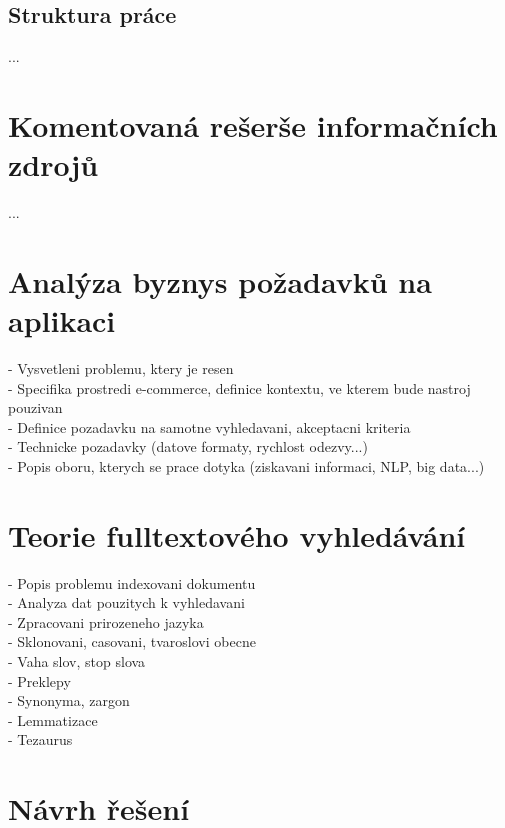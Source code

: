 \documentclass[FM,DP]{tulthesis}
\begin{document}
\section{Struktura práce}
...


\chapter{Komentovaná rešerše informačních zdrojů}
...


\chapter{Analýza byznys požadavků na aplikaci}
- Vysvetleni problemu, ktery je resen\\
- Specifika prostredi e-commerce, definice kontextu, ve kterem bude nastroj pouzivan\\
- Definice pozadavku na samotne vyhledavani, akceptacni kriteria\\
- Technicke pozadavky (datove formaty, rychlost odezvy...)\\
- Popis oboru, kterych se prace dotyka (ziskavani informaci, NLP, big data...)

\chapter{Teorie fulltextového vyhledávání}
- Popis problemu indexovani dokumentu\\
- Analyza dat pouzitych k vyhledavani\\
- Zpracovani prirozeneho jazyka\\
- Sklonovani, casovani, tvaroslovi obecne\\
\hspace*{5mm}- Vaha slov, stop slova\\
\hspace*{5mm}- Preklepy\\
\hspace*{5mm}- Synonyma, zargon\\
\hspace*{5mm}- Lemmatizace\\
\hspace*{5mm}- Tezaurus

\chapter{Návrh řešení}
\end{document}
